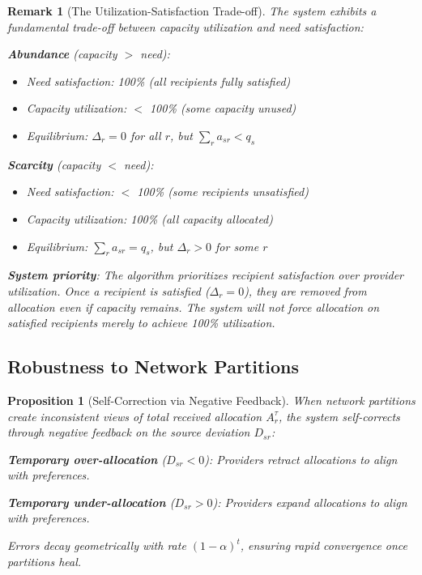 \documentclass[11pt]{article}
\newtheorem{proposition}{Proposition}
\newtheorem{remark}{Remark}
\begin{document}
\begin{remark}[The Utilization-Satisfaction Trade-off]
The system exhibits a fundamental trade-off between capacity utilization and need satisfaction:

\textbf{Abundance} (capacity $>$ need):
\begin{itemize}
\item[\(\checkmark\)] Need satisfaction: 100\% (all recipients fully satisfied)
\item[\(\times\)] Capacity utilization: $<$ 100\% (some capacity unused)
\item Equilibrium: $\Delta_r = 0$ for all $r$, but $\sum_r a_{sr} < q_s$
\end{itemize}

\textbf{Scarcity} (capacity $<$ need):
\begin{itemize}
\item[\(\times\)] Need satisfaction: $<$ 100\% (some recipients unsatisfied)
\item[\(\checkmark\)] Capacity utilization: 100\% (all capacity allocated)
\item Equilibrium: $\sum_r a_{sr} = q_s$, but $\Delta_r > 0$ for some $r$
\end{itemize}

\textbf{System priority}: The algorithm prioritizes recipient satisfaction over provider utilization. Once a recipient is satisfied ($\Delta_r = 0$), they are removed from allocation even if capacity remains. The system will not force allocation on satisfied recipients merely to achieve 100\% utilization.
\end{remark}

\subsection{Robustness to Network Partitions}

\begin{proposition}[Self-Correction via Negative Feedback]
When network partitions create inconsistent views of total received allocation $A_r^\tau$, the system self-corrects through negative feedback on the source deviation $D_{sr}$:

\textbf{Temporary over-allocation} ($D_{sr} < 0$): Providers retract allocations to align with preferences.

\textbf{Temporary under-allocation} ($D_{sr} > 0$): Providers expand allocations to align with preferences.

Errors decay geometrically with rate $(1-\alpha)^t$, ensuring rapid convergence once partitions heal.
\end{proposition}
\end{document}
